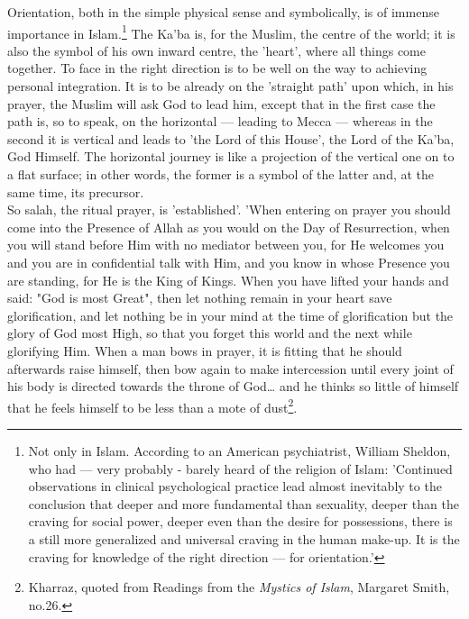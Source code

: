 \documentclass[11pt, b5paper, twoside]{book}
\begin{document}
Orientation, both in the simple physical sense and symbolically, is of immense importance in Islam.\footnote{Not only in Islam. According to an American psychiatrist, William Sheldon, who had --- very probably 
- barely heard of the religion of Islam: 'Continued observations in clinical psychological practice 
lead almost inevitably to the conclusion that deeper and more fundamental than sexuality, deeper than 
the craving for social power, deeper even than the desire for possessions, there is a still more 
generalized and universal craving in the human make-up. It is the craving for knowledge of the right 
direction --- for orientation.'} The Ka'ba is, for the Muslim, the centre of the world; it is also the symbol of his own inward 
centre, the 'heart', where all things come together. To face in the right direction is to be well on 
the way to achieving personal integration. It is to be already on the 'straight path' upon which, in 
his prayer, the Muslim will ask God to lead him, except that in the first case the path is, so to 
speak, on the horizontal --- leading to Mecca --- whereas in the second it is vertical and leads to 'the 
Lord of this House', the Lord of the Ka'ba, God Himself. The horizontal journey is like a projection 
of the vertical one on to a flat surface; in other words, the former is a symbol of the latter and, 
at the same time, its precursor. \\

So salah, the ritual prayer, is 'established'. 'When entering on prayer you should come into the 
Presence of Allah as you would on the Day of Resurrection, when you will stand before Him with no 
mediator between you, for He welcomes you and you are in confidential talk with Him, and you know in 
whose Presence you are standing, for He is the King of Kings. When you have lifted your hands and 
said: "God is most Great", then let nothing remain in your heart save glorification, and let nothing 
be in your mind at the time of glorification but the glory of God most High, so that you forget this 
world and the next while glorifying Him. When a man bows in prayer, it is fitting that he should 
afterwards raise himself, then bow again to make intercession until every joint of his body is 
directed towards the throne of God\ldots{} and he thinks so little of himself that he feels himself to be 
less than a mote of dust\footnote{Kharraz, quoted from Readings from the \emph{Mystics of Islam}, Margaret Smith, no.26.}.\\
\end{document}
